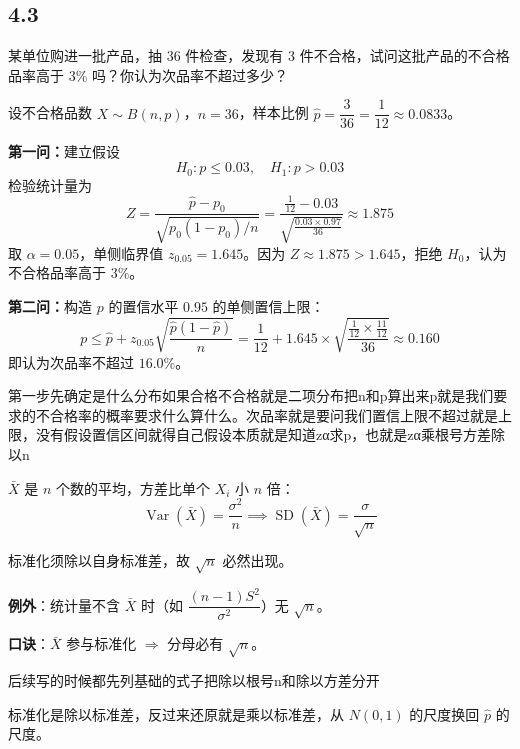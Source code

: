 \subsection{4.3}
\begin{homework}[1]
某单位购进一批产品，抽 36 件检查，发现有 3 件不合格，试问这批产品的不合格品率高于 3\% 吗？你认为次品率不超过多少？
\end{homework}
\begin{solution}
设不合格品数 $X \sim B(n, p)$，$n = 36$，样本比例 $\hat{p} = \dfrac{3}{36} = \dfrac{1}{12} \approx 0.0833$。

\textbf{第一问：}建立假设
\[
H_0: p \leq 0.03, \quad H_1: p > 0.03
\]
检验统计量为
\[
Z = \frac{\hat{p} - p_0}{\sqrt{p_0(1-p_0)/n}} = \frac{\frac{1}{12} - 0.03}{\sqrt{\frac{0.03 \times 0.97}{36}}} \approx 1.875
\]
取 $\alpha = 0.05$，单侧临界值 $z_{0.05} = 1.645$。因为 $Z \approx 1.875 > 1.645$，拒绝 $H_0$，认为不合格品率高于 $3\%$。

\textbf{第二问：}构造 $p$ 的置信水平 $0.95$ 的单侧置信上限：
\[
p \leq \hat{p} + z_{0.05}\sqrt{\frac{\hat{p}(1-\hat{p})}{n}} = \frac{1}{12} + 1.645 \times \sqrt{\frac{\frac{1}{12} \times \frac{11}{12}}{36}} \approx 0.160
\]
即认为次品率不超过 $16.0\%$。
\end{solution}
\begin{dxtips}
    第一步先确定是什么分布如果合格不合格就是二项分布把n和p算出来p就是我们要求的不合格率的概率要求什么算什么。次品率就是要问我们置信上限不超过就是上限，没有假设置信区间就得自己假设本质就是知道zα求p，也就是zα乘根号方差除以n
\end{dxtips}
\begin{dxtips}
   $\bar{X}$ 是 $n$ 个数的平均，方差比单个 $X_i$ 小 $n$ 倍：
$$\operatorname{Var}(\bar{X}) = \frac{\sigma^2}{n} \implies \operatorname{SD}(\bar{X}) = \frac{\sigma}{\sqrt{n}}$$

标准化须除以自身标准差，故 $\sqrt{n}$ 必然出现。

\textbf{例外}：统计量不含 $\bar{X}$ 时（如 $\dfrac{(n-1)S^2}{\sigma^2}$）无 $\sqrt{n}$。

\textbf{口诀}：$\bar{X}$ 参与标准化 $\Longrightarrow$ 分母必有 $\sqrt{n}$。
    
\end{dxtips}
\begin{dxtips}
后续写的时候都先列基础的式子把除以根号n和除以方差分开
\end{dxtips}
\begin{note}
标准化是除以标准差，反过来还原就是乘以标准差，从 $N(0,1)$ 的尺度换回 $\hat{p}$ 的尺度。
\end{note}
